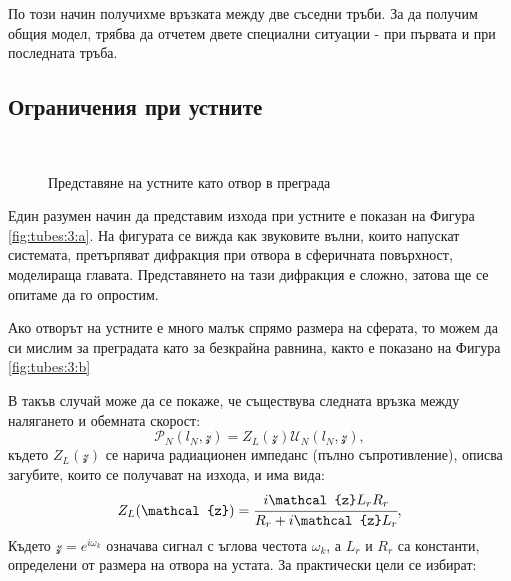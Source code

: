 \documentclass[main.tex]{subfiles}
\begin{document}
По този начин получихме връзката между две съседни тръби. За да получим общия модел, трябва да отчетем двете специални ситуации - при първата и при последната тръба.

\subsection{Ограничения при устните}\label{tubes:lips}

 	᠎
 	᠎ 

\begin{center}
\begin{figure}[ht]%
    \centering
    \begin{changemargin}{0cm}{0cm} 
        \hspace{0.2\paperwidth}
    \end{changemargin} 
    \caption{Представяне на устните като отвор в преграда}%
    \label{fig:tubes:3}
\end{figure}
\end{center}

Един разумен начин да представим изхода при устните е показан на Фигура \autoref{fig:tubes:3:a}. На фигурата се вижда как звуковите вълни, които напускат системата, претърпяват дифракция при отвора в сферичната повърхност, моделираща главата. Представянето на тази дифракция е сложно, затова ще се опитаме да го опростим.

Ако отворът на устните е много малък спрямо размера на сферата, то можем да 
си мислим за преградата като за безкрайна равнина, както е показано на Фигура \autoref{fig:tubes:3:b}

В такъв случай може да се покаже, че съществува следната връзка между налягането и обемната скорост:
\begin{equation}
    \label{eq:tubes:14}
    \mathcal{P}_N(l_N, \mathcal{z}) = Z_L(\mathcal{z}) \mathcal{U}_N(l_N, \mathcal{z}),
\end{equation}
където 
$Z_L(\mathcal{z})$ се нарича радиационен импеданс (пълно съпротивление), описва загубите, които се получават на изхода, и има вида:
\begin{align}
    \label{eq:tubes:impedance}
    Z_L(\mathcal{z}) = \cfrac{i\mathcal{z} L_r R_r}{R_r + i\mathcal{z} L_r},    
\end{align}
Където $\mathcal{z} = e^{i\omega_k}$ означава сигнал с ъглова честота $\omega_k$, а $L_r$ и $R_r$ са константи, определени от размера на отвора на устата. За практически цели се избират:
\end{document}

